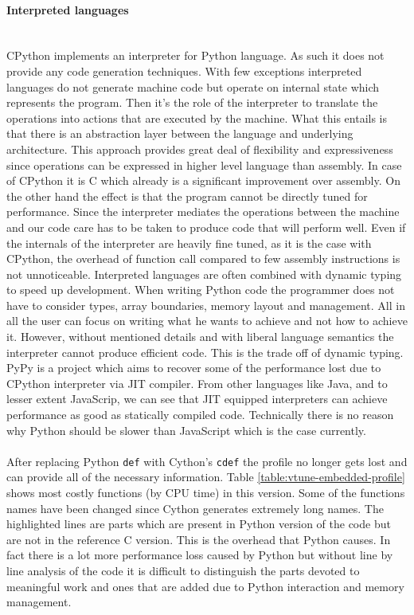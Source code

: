 \documentclass[12pt, a4paper]{report}
\newcommand{\myparagraph}[1]{\paragraph{#1}\mbox{}\\}
\begin{document}
\myparagraph{Interpreted languages}\label{para:interpret-lang}
CPython implements an interpreter for Python language. As such it does not provide
any code generation techniques. With few exceptions interpreted languages do not
generate machine code but operate on internal state which represents the program.
Then it's the role of the interpreter to translate the operations into actions
that are executed by the machine. What this entails is that there is an
abstraction layer between the language and underlying architecture. This
approach provides great deal of flexibility and expressiveness since operations
can be expressed in higher level language than assembly. In case of CPython it
is C which already is a significant improvement over assembly. On the other hand
the effect is that the program cannot be directly tuned for performance. Since
the interpreter mediates the operations between the machine and our code care
has to be taken to produce code that will perform well. Even if the internals
of the interpreter are heavily fine tuned, as it is the case with CPython, the
overhead of function call compared to few assembly instructions is not unnoticeable.
Interpreted languages are often combined with dynamic typing to speed up development.
When writing Python code the programmer does not have to consider types,
array boundaries, memory layout and management. All in all the user can focus
on writing what he wants to achieve and not how to achieve it. However, without
mentioned details and with liberal language semantics the interpreter cannot
produce efficient code. This is the trade off of dynamic typing. PyPy is a
project which aims to recover some of the performance lost due to CPython
interpreter via JIT compiler. From other languages like Java, and to lesser
extent JavaScrip, we can see that JIT equipped interpreters can achieve performance
as good as statically compiled code. Technically there is no reason why Python
should be slower than JavaScript which is the case currently.
\\\\
After replacing Python \lstinline{def} with Cython's \lstinline{cdef} the profile
no longer gets lost and can provide all of the necessary information. Table
\ref{table:vtune-embedded-profile} shows most costly functions (by CPU time)
in this version. Some of the functions names have been changed since Cython
generates extremely long names. The highlighted lines are parts which are
present in Python version of the code but are not in the reference C version.
This is the overhead that Python causes. In fact there is a lot more performance
loss caused by Python but without line by line analysis of the code it is
difficult to distinguish the parts devoted to meaningful work and ones that
are added due to Python interaction and memory management.
\end{document}
